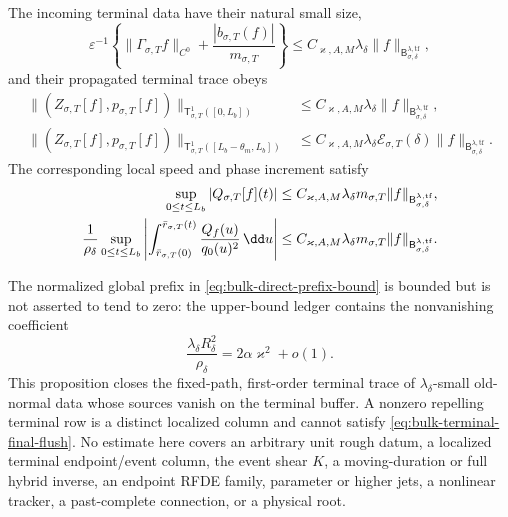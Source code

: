 \begin{proposition}
The incoming terminal data have their natural small size,
\begin{equation}
 \varepsilon^{-1}\left\{
   \|\Gamma_{\sigma,T}f\|_{C^0}
    +\frac{|b_{\sigma,T}(f)|}{m_{\sigma,T}}\right\}
 \le C_{\varkappa,A,M}\lambda_\delta
       \|f\|_{\mathsf B_{\sigma,\delta}^{\lambda,\mathrm{tf}}},
                                                        \label{eq:bulk-terminal-interface-bound}
\end{equation}
and their propagated terminal trace obeys
\begin{align}
 \|(Z_{\sigma,T}[f],p_{\sigma,T}[f])\|_
       {\mathsf T_{\sigma,T}^1([0,L_b])}
 &\le C_{\varkappa,A,M}\lambda_\delta
       \|f\|_{\mathsf B_{\sigma,\delta}^{\lambda,\mathrm{tf}}},
                                                        \label{eq:bulk-terminal-full-trace-bound}\\
 \|(Z_{\sigma,T}[f],p_{\sigma,T}[f])\|_
       {\mathsf T_{\sigma,T}^1([L_b-\theta_m,L_b])}
 &\le C_{\varkappa,A,M}\lambda_\delta
       \mathcal E_{\sigma,T}(\delta)
       \|f\|_{\mathsf B_{\sigma,\delta}^{\lambda,\mathrm{tf}}}.
                                                        \label{eq:bulk-terminal-final-flush}
\end{align}
The corresponding local speed and phase increment satisfy
\begin{align}
 \sup_{0\le t\le L_b}|Q_{\sigma,T}[f](t)|
 &\le C_{\varkappa,A,M}\lambda_\delta m_{\sigma,T}
       \|f\|_{\mathsf B_{\sigma,\delta}^{\lambda,\mathrm{tf}}},\notag\\
 \frac1{\rho_\delta}\sup_{0\le t\le L_b}
 \left|\int_{\bar r_{\sigma,T}(0)}^{\bar r_{\sigma,T}(t)}
        \frac{Q_f(u)}{q_0(u)^2}\,\dd u\right|
 &\le C_{\varkappa,A,M}\lambda_\delta m_{\sigma,T}
       \|f\|_{\mathsf B_{\sigma,\delta}^{\lambda,\mathrm{tf}}}.
                                                        \label{eq:bulk-terminal-local-action}
\end{align}

The normalized global prefix in
\cref{eq:bulk-direct-prefix-bound} is bounded but is not asserted to tend
to zero: the upper-bound ledger contains the nonvanishing coefficient
\begin{equation}
 \frac{\lambda_\delta R_\delta^2}{\rho_\delta}
 =2\alpha\varkappa^2+o(1).                       \label{eq:bulk-prefix-nonsmall-scale}
\end{equation}
This proposition closes the fixed-path, first-order terminal trace of
\(\lambda_\delta\)-small old-normal data whose sources vanish on the
terminal buffer.  A nonzero repelling terminal row is a distinct localized
column and cannot satisfy
\cref{eq:bulk-terminal-final-flush}.  No estimate here covers an arbitrary
unit rough datum, a localized terminal endpoint/event column, the event shear \(K\),
a moving-duration or full hybrid inverse, an endpoint RFDE family,
parameter or higher jets, a nonlinear tracker, a past-complete connection,
or a physical root.
\end{proposition}

